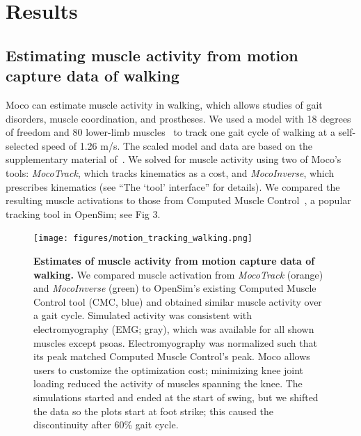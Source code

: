 \documentclass[10pt,letterpaper]{article}
\begin{document}
\section*{Results}

\subsection*{Estimating muscle activity from motion capture data of walking}

Moco can estimate muscle activity in walking, which allows studies of gait disorders, muscle coordination, and prostheses. We used a model with 18 degrees of freedom and 80 lower-limb muscles~\cite{Rajagopal:2016ek} to track one gait cycle of walking at a self-selected speed of 1.26 m/s. The scaled model and data are based on the supplementary material of~\cite{Rajagopal:2016ek}. We solved for muscle activity using two of Moco’s tools: \textit{MocoTrack}, which tracks kinematics as a cost, and \textit{MocoInverse}, which prescribes kinematics (see “The ‘tool’ interface” for details). We compared the resulting muscle activations to those from Computed Muscle Control~\cite{Thelen:2003bba}, a popular tracking tool in OpenSim; see Fig 3.

\begin{figure}[!h]
        \begin{adjustwidth}{-2.25in}{0in} %
    \centering
    \texttt{[image: figures/motion\_tracking\_walking.png]}
    \caption{{\bf Estimates of muscle activity from motion capture data of walking.}
    We compared muscle activation from \textit{MocoTrack} (orange) and \textit{MocoInverse} (green) to OpenSim’s existing Computed Muscle Control tool (CMC, blue) and obtained similar muscle activity over a gait cycle. Simulated activity was consistent with electromyography (EMG; gray), which was available for all shown muscles except psoas. Electromyography was normalized such that its peak matched Computed Muscle Control's peak. Moco allows users to customize the optimization cost; minimizing knee joint loading reduced the activity of muscles spanning the knee. The simulations started and ended at the start of swing, but we shifted the data so the plots start at foot strike; this caused the discontinuity after 60\% gait cycle.}
    \label{walking}
        \end{adjustwidth}
\end{figure}
\end{document}
